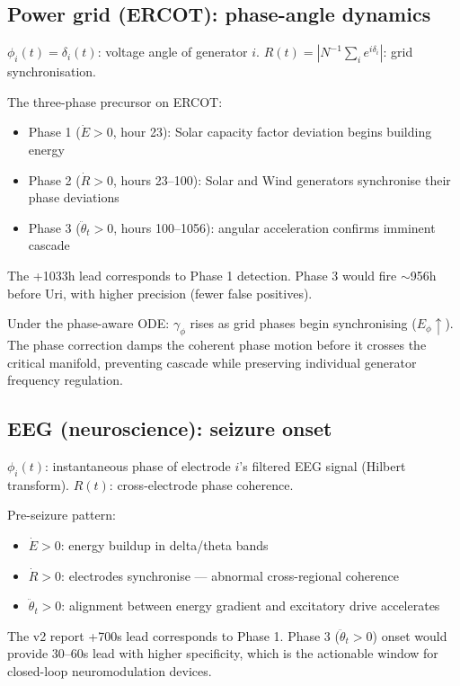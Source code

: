 \documentclass[11pt,a4paper]{article}
\theoremstyle{definition}
\begin{document}
\subsection{Power grid (ERCOT): phase-angle dynamics}

$\phi_i(t) = \delta_i(t)$: voltage angle of generator $i$.
$R(t) = |N^{-1}\sum_i e^{i\delta_i}|$: grid synchronisation.

The three-phase precursor on ERCOT:
\begin{itemize}
\item Phase 1 ($\dot E > 0$, hour 23): Solar capacity factor deviation begins building energy
\item Phase 2 ($\dot R > 0$, hours 23--100): Solar and Wind generators synchronise their phase deviations
\item Phase 3 ($\ddot\theta_t > 0$, hours 100--1056): angular acceleration confirms imminent cascade
\end{itemize}

The +1033h lead corresponds to Phase 1 detection.
Phase 3 would fire $\sim$956h before Uri, with higher precision (fewer false positives).

Under the phase-aware ODE: $\gamma_\phi$ rises as grid phases begin synchronising ($E_\phi \uparrow$).
The phase correction damps the coherent phase motion before it crosses the critical manifold,
preventing cascade while preserving individual generator frequency regulation.

\subsection{EEG (neuroscience): seizure onset}

$\phi_i(t)$: instantaneous phase of electrode $i$'s filtered EEG signal (Hilbert transform).
$R(t)$: cross-electrode phase coherence.

Pre-seizure pattern:
\begin{itemize}
\item $\dot E > 0$: energy buildup in delta/theta bands
\item $\dot R > 0$: electrodes synchronise — abnormal cross-regional coherence
\item $\ddot\theta_t > 0$: alignment between energy gradient and excitatory drive accelerates
\end{itemize}

The v2 report +700s lead corresponds to Phase 1.
Phase 3 ($\ddot\theta_t > 0$) onset would provide 30--60s lead with higher specificity,
which is the actionable window for closed-loop neuromodulation devices.
\end{document}

